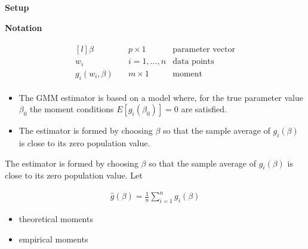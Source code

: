 \begin{frame}\begin{center}
		\LARGE\textbf{Setup}
\end{center}\end{frame}
\begin{frame}\textbf{Notation}\vspace{0.3cm}

\begin{align*}\begin{matrix*}[l]
\beta           &\quad p \times 1     & \text{parameter vector} \\
w_i             &\quad i = 1, \hdots, n & \text{data points}      \\
g_i(w_i, \beta) &\quad m \times 1 & \text{moment}
\end{matrix*}\end{align*}

\end{frame}
\begin{frame}

\begin{itemize}\setlength\itemsep{1em}
\item The GMM estimator is based on a model where, for the true parameter value $\beta_0$ the moment conditions
$E[g_i (\beta_0)] = 0$ are satisfied.
\item The estimator is formed by choosing $\beta$ so that the sample average of $g_i(\beta)$ is close to
its zero population value.
\end{itemize}

\end{frame}
\begin{frame}

The estimator is formed by choosing $\beta$ so that the sample average of $g_i(\beta)$ is close to its zero population value. Let

\begin{align*}
\hat{g}(\beta) = \frac{1}{n} \sum_{i=1}^n g_i(\beta)
\end{align*}

\begin{itemize}\setlength\itemsep{1em}
\item theoretical moments
\item empirical moments
\end{itemize}

\end{frame}
